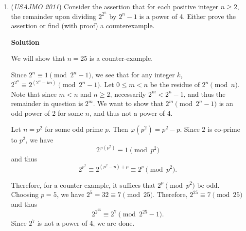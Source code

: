 \begin{enumerate}
 Since quadrilateral $BOMP$ is cyclic, $\angle BMP = \angle BOP$.  Triangles $BOP$ and $DOP$ are congruent, so $\angle BOP = \angle BOD/2 = \angle BED$, so $\angle BMP = \angle BED$. Because $AC$ and $DE$ are parallel, $M$ lies on $BE$ (using Euclid's Parallel Postulate).

 -Evan Chen (vEnhance)

 



\textbf{Solution 4}

Note that by Lemma 9.9 of EGMO, $(A,C;B,D)$ is a harmonic bundle. We project through $E$ onto $\overline{AC}$,
 \[-1=(A,C;B,D)\stackrel{E}{=}(A,C;M,P_{\infty})\]Where $P_{\infty}$ is the point at infinity for parallel lines $\overline{DE}$ and $\overline{AC}$. Thus, we get $\frac{MA}{MC}=-1$, and $M$ is the midpoint of $AC$. ~novus677

 \textbf{The power of angle chasing=} 


 


	\item (\textit{USAJMO 2011}) Consider the assertion that for each positive integer $n \ge 2$, the remainder upon dividing $2^{2^n}$ by $2^n - 1$ is a power of 4.  Either prove the assertion or find (with proof) a counterexample.


 



\textbf{Solution}

We will show that $n = 25$ is a counter-example.

 Since $\textstyle 2^n \equiv 1 \pmod{2^n - 1}$, we see that for any integer $k$, $\textstyle 2^{2^n} \equiv 2^{(2^n - kn)} \pmod{2^n-1}$. Let $0 \le m < n$ be the residue of $2^n \pmod n$. Note that since $\textstyle m < n$ and $\textstyle n \ge 2$, necessarily $\textstyle 2^m < 2^n -1$, and thus the remainder in question is $\textstyle 2^m$. We want to show that $\textstyle 2^m \pmod {2^n-1}$ is an odd power of 2 for some $\textstyle n$, and thus not a power of 4.

 Let $\textstyle n=p^2$ for some odd prime $\textstyle p$. Then $\textstyle \varphi(p^2) = p^2 - p$. Since 2 is co-prime to $\textstyle p^2$, we have
 \[{2^{\varphi(p^2)} \equiv 1 \pmod{p^2}}\]and thus
 \[\textstyle 2^{p^2} \equiv 2^{(p^2 - p) + p} \equiv 2^p \pmod{p^2}.\]

 Therefore, for a counter-example, it suffices that $\textstyle 2^p \pmod{p^2}$ be odd. Choosing $\textstyle p=5$, we have $\textstyle 2^5 = 32 \equiv 7 \pmod{25}$. Therefore, $\textstyle 2^{25} \equiv 7 \pmod{25}$ and thus
 \[\textstyle 2^{2^{25}} \equiv 2^7 \pmod {2^{25} - 1}.\]Since $\textstyle 2^7$ is not a power of 4, we are done.


\end{enumerate}
